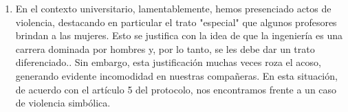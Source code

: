 \documentclass[12pt, a4paper]{article}
\begin{document}
\begin{enumerate}
      \item En el contexto universitario, lamentablemente, hemos presenciado actos de violencia, destacando en particular el trato "especial" que algunos profesores brindan a las mujeres. Esto se justifica con la idea de que la ingeniería es una carrera dominada por hombres y, por lo tanto, se les debe dar un trato diferenciado.. Sin embargo, esta justificación muchas veces roza el acoso, generando evidente incomodidad en nuestras compañeras. En esta situación, de acuerdo con el artículo 5 del protocolo, nos encontramos frente a un caso de violencia simbólica.

    \end{enumerate}
    
\end{document}
